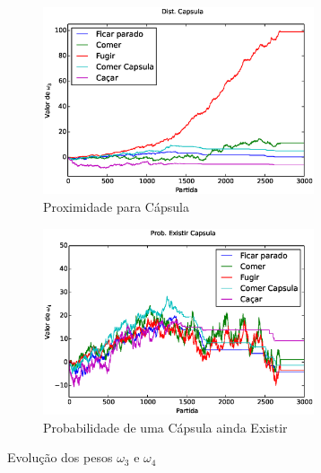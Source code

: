 \begin{figure}[H]
	\centering
	\begin{subfigure}[t]{.5\textwidth}
		\centering
		\includegraphics[width=80mm]{images/5_behaviors_small_map/weights____pol__DistCapsula}
		\caption{Proximidade para Cápsula}
		\label{img:5ComportamentosMapaPequeno:PesoDistCapsula}
	\end{subfigure}%
	\begin{subfigure}[t]{.5\textwidth}
		\centering
		\includegraphics[width=80mm]{images/5_behaviors_small_map/weights____pol__ProbExistirCapsula}
		\caption{Probabilidade de uma Cápsula ainda Existir}
		\label{img:5ComportamentosMapaPequeno:PesoProbCapsulaExistir}
	\end{subfigure}
	\caption{Evolução dos pesos $ \omega_3 $ e $ \omega_4 $}
	\label{img:5ComportamentosMapaPequeno:PesoDistCapsulaOuProbCapsulaExistir}
\end{figure}

